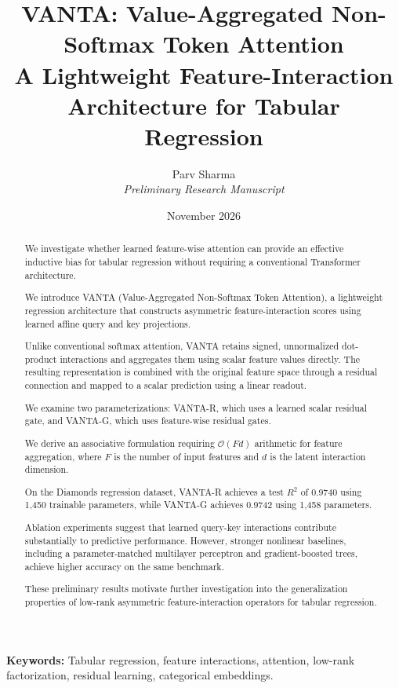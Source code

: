 \documentclass[11pt,a4paper]{article}
\title{
    \textbf{VANTA: Value-Aggregated Non-Softmax Token Attention}\\
    \large A Lightweight Feature-Interaction Architecture
    for Tabular Regression
}
\author{
    Parv Sharma\\
    \textit{Preliminary Research Manuscript}
}
\date{November 2026}
\begin{document}
\maketitle


\begin{abstract}

We investigate whether learned feature-wise attention
can provide an effective inductive bias for tabular
regression without requiring a conventional Transformer
architecture.

We introduce VANTA (Value-Aggregated Non-Softmax
Token Attention), a lightweight regression architecture
that constructs asymmetric feature-interaction scores
using learned affine query and key projections.

Unlike conventional softmax attention, VANTA retains
signed, unnormalized dot-product interactions and
aggregates them using scalar feature values directly.
The resulting representation is combined with the
original feature space through a residual connection
and mapped to a scalar prediction using a linear
readout.

We examine two parameterizations: VANTA-R, which
uses a learned scalar residual gate, and VANTA-G,
which uses feature-wise residual gates.

We derive an associative formulation requiring
$\mathcal{O}(Fd)$ arithmetic for feature aggregation,
where $F$ is the number of input features and $d$
is the latent interaction dimension.

On the Diamonds regression dataset, VANTA-R
achieves a test $R^2$ of 0.9740 using 1,450
trainable parameters, while VANTA-G achieves
0.9742 using 1,458 parameters.

Ablation experiments suggest that learned query-key
interactions contribute substantially to predictive
performance. However, stronger nonlinear baselines,
including a parameter-matched multilayer perceptron
and gradient-boosted trees, achieve higher accuracy
on the same benchmark.

These preliminary results motivate further
investigation into the generalization properties
of low-rank asymmetric feature-interaction
operators for tabular regression.

\end{abstract}

\noindent\textbf{Keywords:}
Tabular regression, feature interactions,
attention, low-rank factorization,
residual learning, categorical embeddings.
\end{document}
